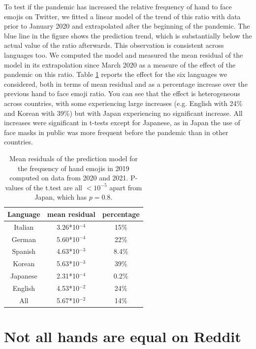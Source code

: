 \documentclass{article}
\begin{document}
To test if the pandemic has increased the relative frequency of hand to face emojis on Twitter, we fitted a linear model of the trend of this ratio with data prior to January 2020 and extrapolated after the beginning of the pandemic. The blue line in the figure shows the prediction trend, which is substantially below the actual value of the ratio afterwards. This observation is consistent across languages too. We computed the model and measured the mean residual of the model in its extrapolation since March 2020 as a measure of the effect of the pandemic on this ratio. Table \ref{tab:lm_hoverf} reports the effect for the six languages we considered, both in terms of mean residual and as a percentage increase over the previous hand to face emoji ratio. You can see that the effect is heterogeneous across countries, with some experiencing large increases (e.g. English with 24\% and Korean with 39\%) but with Japan experiencing no significant increase. All increases were significant in t-tests except for Japanese, as in Japan the use of face masks in public was more frequent before the pandemic than in other countries.



\begin{table}[hbtp]
    \centering
    \begin{tabular}{|c|c|c|}
    \hline
    Language & mean residual & percentage\\
    \hline
        Italian & 3.26*10$^{-4}$ & 15\% \\
        \hline
        German & 5.60*10$^{-4}$ & 22\%\\
        \hline
        Spanish & 4.63*10$^{-3}$& 8.4\%\\
        \hline
        Korean & 5.63*10$^{-3}$& 39\%\\
        \hline
        Japanese & 2.31*10$^{-4}$&0.2\% \\
        \hline
        English & 4.53*10$^{-2}$& 24\% \\
        \hline
        All & 5.67*10$^{-2}$ & 14\%\\
        \hline
    \end{tabular}
    \caption{Mean residuals of the prediction model for the frequency of hand emojis in 2019 computed on data from 2020 and 2021. P-values of the t.test are all $<10^{-5}$ apart from Japan, which has $p=0.8$.}
    \label{tab:lm_hoverf}
\end{table}

\section{Not all hands are equal on Reddit}
\end{document}
